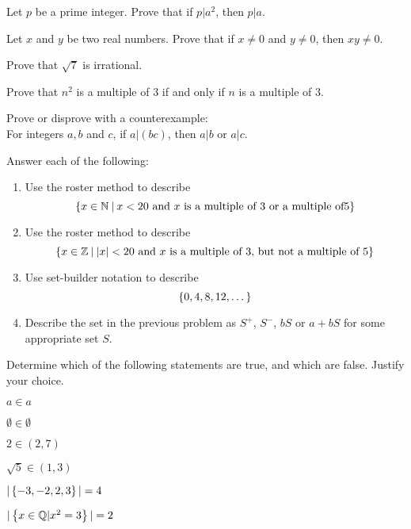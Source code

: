 \documentclass[12pt]{article}
\begin{document}
\begin{qu} 
Let $p$ be a prime integer. Prove that if $p|a^2$, then $p|a$.
\end{qu}

\begin{qu} 
Let $x$ and $y$ be two real numbers. Prove that if $x \ne 0$ and $y \ne 0$, then $xy \ne 0$.
\end{qu}

\begin{qu} 
Prove that $\sqrt{7}$ is irrational.
\end{qu}

\begin{qu} 
Prove that $n^2$ is a multiple of 3 if and only if $n$ is a multiple of 3. \end{qu}


\begin{qu} Prove or disprove with a counterexample:\\
For integers $a, b$ and $c$, if $a|(bc)$, then $a|b$ or $a|c$. 
\end{qu}

\begin{qu}
Answer each of the following:
\begin{enumerate}[label=\alph*)]
\item Use the roster method to describe $$\left\{x\in \mathbb{N}\: | \: x<20 \textrm{ and } x \textrm{ is a multiple of }3 \textrm{ or a multiple of} 5\right\}$$ 
\item Use the roster method to describe $$\left\{x\in \mathbb{Z}\: | \: |x|<20 \textrm{ and } x \textrm{ is a multiple of }3\textrm{, but not a multiple of } 5\right\}$$ 
\item Use set-builder notation to describe $$\left\{ 0, 4, 8, 12, \dots \right\}$$
\item Describe the set in the previous problem as $S^+$, $S^-$, $bS$ or $a+bS$ for some appropriate set $S$.
\end{enumerate}
\end{qu}

\begin{qu}
Determine which of the following statements are true, and which are false. Justify your choice.

\begin{inparaenum}[a)]
\item $a \in {a}$
\tab\item  $\emptyset \in \emptyset$
\tab\item $2 \in (2,7)$
\tab\item $\sqrt{5} \in (1,3)$
\tab\item $|\left\{-3, -2, 2, 3\right\}|=4$
\tab\item $|\left\{x\in \mathbb{Q} | x^2=3 \right\}|=2$
\end{inparaenum}
\end{qu}
\end{document}

